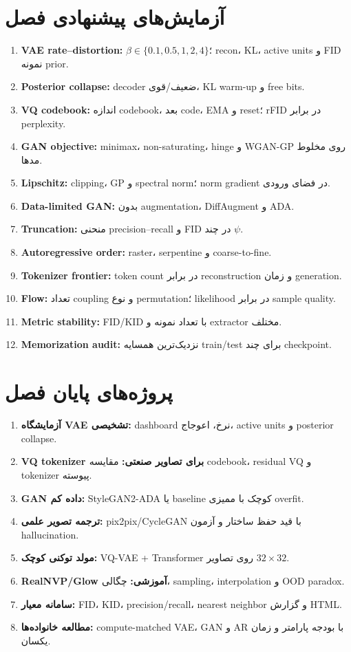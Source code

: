 \documentclass[12pt,openany,oneside]{book}
\begin{document}
\section{آزمایش‌های پیشنهادی فصل}
\begin{enumerate}
\item \textbf{VAE rate--distortion:} $\beta\in\{0.1,0.5,1,2,4\}$؛ recon، KL، active units و FID نمونه prior.
\item \textbf{Posterior collapse:} decoder ضعیف/قوی، KL warm-up و free bits.
\item \textbf{VQ codebook:} اندازه codebook، بعد code، EMA و reset؛ rFID در برابر perplexity.
\item \textbf{GAN objective:} minimax، non-saturating، hinge و WGAN-GP روی مخلوط مدها.
\item \textbf{Lipschitz:} clipping، GP و spectral norm؛ norm gradient در فضای ورودی.
\item \textbf{Data-limited GAN:} بدون augmentation، DiffAugment و ADA.
\item \textbf{Truncation:} منحنی precision--recall و FID در چند $\psi$.
\item \textbf{Autoregressive order:} raster، serpentine و coarse-to-fine.
\item \textbf{Tokenizer frontier:} token count در برابر reconstruction و زمان generation.
\item \textbf{Flow:} تعداد coupling و نوع permutation؛ likelihood در برابر sample quality.
\item \textbf{Metric stability:} FID/KID با تعداد نمونه و extractor مختلف.
\item \textbf{Memorization audit:} نزدیک‌ترین همسایه train/test برای چند checkpoint.
\end{enumerate}

\section{پروژه‌های پایان فصل}
\begin{enumerate}
\item \textbf{آزمایشگاه VAE تشخیصی:} dashboard نرخ، اعوجاج، active units و posterior collapse.
\item \textbf{VQ tokenizer برای تصاویر صنعتی:} مقایسه codebook، residual VQ و tokenizer پیوسته.
\item \textbf{GAN داده کم:} StyleGAN2-ADA یا baseline کوچک با ممیزی overfit.
\item \textbf{ترجمه تصویر علمی:} pix2pix/CycleGAN با قید حفظ ساختار و آزمون hallucination.
\item \textbf{مولد توکنی کوچک:} VQ-VAE + Transformer روی تصاویر $32\times32$.
\item \textbf{RealNVP/Glow آموزشی:} چگالی، sampling، interpolation و OOD paradox.
\item \textbf{سامانه معیار:} FID، KID، precision/recall، nearest neighbor و گزارش HTML.
\item \textbf{مطالعه خانواده‌ها:} compute-matched VAE، GAN و AR با بودجه پارامتر و زمان یکسان.
\end{enumerate}
\end{document}
